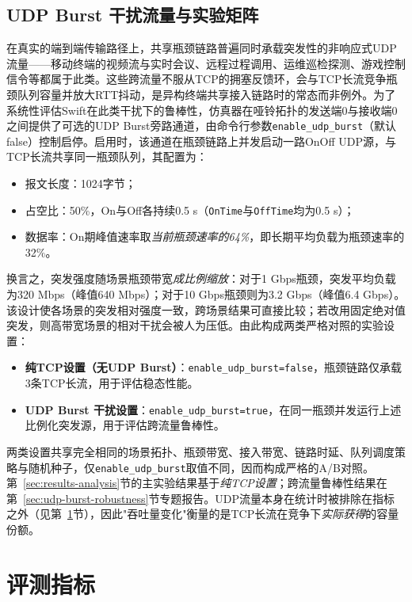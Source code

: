 \subsection{UDP Burst 干扰流量与实验矩阵}
\label{sec:udp-burst-matrix}

在真实的端到端传输路径上，共享瓶颈链路普遍同时承载突发性的非响应式UDP流量——移动终端的视频流与实时会议、远程过程调用、运维巡检探测、游戏控制信令等都属于此类。这些跨流量不服从TCP的拥塞反馈环，会与TCP长流竞争瓶颈队列容量并放大RTT抖动，是异构终端共享接入链路时的常态而非例外。为了系统性评估Swift在此类干扰下的鲁棒性，仿真器在哑铃拓扑的发送端0与接收端0之间提供了可选的UDP Burst旁路通道，由命令行参数\texttt{enable\_udp\_burst}（默认false）控制启停。启用时，该通道在瓶颈链路上并发启动一路OnOff UDP源，与TCP长流共享同一瓶颈队列，其配置为：

\begin{itemize}
    \item 报文长度：1024字节；
    \item 占空比：50\%，On与Off各持续0.5 s（\texttt{OnTime}与\texttt{OffTime}均为0.5 s）；
    \item 数据率：On期峰值速率取\emph{当前瓶颈速率的64\%}，即长期平均负载为瓶颈速率的32\%。
\end{itemize}

换言之，突发强度随场景瓶颈带宽\emph{成比例缩放}：对于1 Gbps瓶颈，突发平均负载为320 Mbps（峰值640 Mbps）；对于10 Gbps瓶颈则为3.2 Gbps（峰值6.4 Gbps）。该设计使各场景的突发相对强度一致，跨场景结果可直接比较；若改用固定绝对值突发，则高带宽场景的相对干扰会被人为压低。由此构成两类严格对照的实验设置：

\begin{itemize}
\item \textbf{纯TCP设置（无UDP Burst）}：\texttt{enable\_udp\_burst=false}，瓶颈链路仅承载3条TCP长流，用于评估稳态性能。
\item \textbf{UDP Burst 干扰设置}：\texttt{enable\_udp\_burst=true}，在同一瓶颈并发运行上述比例化突发源，用于评估跨流量鲁棒性。
\end{itemize}

两类设置共享完全相同的场景拓扑、瓶颈带宽、接入带宽、链路时延、队列调度策略与随机种子，仅\texttt{enable\_udp\_burst}取值不同，因而构成严格的A/B对照。第~\ref{sec:results-analysis}节的主实验结果基于\emph{纯TCP设置}；跨流量鲁棒性结果在第~\ref{sec:udp-burst-robustness}节专题报告。UDP流量本身在统计时被排除在指标之外（见第~\ref{sec:metrics}节），因此"吞吐量变化"衡量的是TCP长流在竞争下\emph{实际获得}的容量份额。

\section{评测指标}
\label{sec:metrics}

